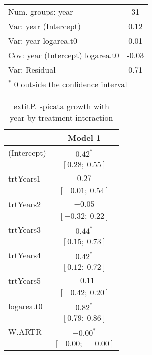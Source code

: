 \begin{table}
\begin{center}
\begin{tabular}{l c }
Num. groups: year                & 31                \\
Var: year (Intercept)            & 0.12              \\
Var: year logarea.t0             & 0.01              \\
Cov: year (Intercept) logarea.t0 & -0.03             \\
Var: Residual                    & 0.71              \\
\hline
\multicolumn{2}{l}{\scriptsize{$^*$ 0 outside the confidence interval}}
\end{tabular}
\label{table:PSSPgrowth-inARTR}
\end{center}
\end{table}


\begin{table}
\caption{	extit{P. spicata} growth with year-by-treatment interaction}
\begin{center}
\begin{tabular}{l c }
\hline
 & Model 1 \\
\hline
(Intercept)                      & $0.42^{*}$        \\
                                 & $[0.28;\ 0.55]$   \\
trtYears1                        & $0.27$            \\
                                 & $[-0.01;\ 0.54]$  \\
trtYears2                        & $-0.05$           \\
                                 & $[-0.32;\ 0.22]$  \\
trtYears3                        & $0.44^{*}$        \\
                                 & $[0.15;\ 0.73]$   \\
trtYears4                        & $0.42^{*}$        \\
                                 & $[0.12;\ 0.72]$   \\
trtYears5                        & $-0.11$           \\
                                 & $[-0.42;\ 0.20]$  \\
logarea.t0                       & $0.82^{*}$        \\
                                 & $[0.79;\ 0.86]$   \\
W.ARTR                           & $-0.00^{*}$       \\
                                 & $[-0.00;\ -0.00]$ \\

\end{tabular}
\end{center}
\end{table}
